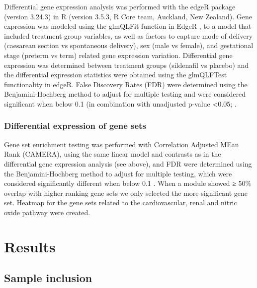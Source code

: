 \documentclass[authordate, empirical]{jote-new-article}
\begin{document}
	Differential gene expression analysis was performed with the edgeR package (version 3.24.3) in R (version 3.5.3, R Core team, Auckland, New Zealand). Gene expression was modeled using the glmQLFit function in EdgeR \parencites{Robinson2010}, to a model that included treatment group variables, as well as factors to capture mode of delivery (caesarean section vs spontaneous delivery), sex (male vs female), and gestational stage (preterm vs term) related gene expression variation. Differential gene expression was determined between treatment groups (sildenafil vs placebo) and the differential expression statistics were obtained using the glmQLFTest functionality in edgeR. False Discovery Rates (FDR) were determined using the Benjamini-Hochberg method to adjust for multiple testing and were considered significant when below 0.1 (in combination with unadjusted p-value <0.05; \parencites{Benjamini1995}.







	\subsubsection{Differential expression of gene sets}



	Gene set enrichment testing was performed with Correlation Adjusted MEan Rank (CAMERA), using the same linear model and contrasts as in the differential gene expression analysis (see above), and FDR were determined using the Benjamini-Hochberg method to adjust for multiple testing, which were considered significantly different when below 0.1 \parencites{Benjamini1995}. When a module showed ≥ 50\% overlap with higher ranking gene sets we only selected the more significant gene set. Heatmap for the gene sets related to the cardiovascular, renal and nitric oxide pathway were created.







	\section{Results}







	\subsection{Sample inclusion}
\end{document}
